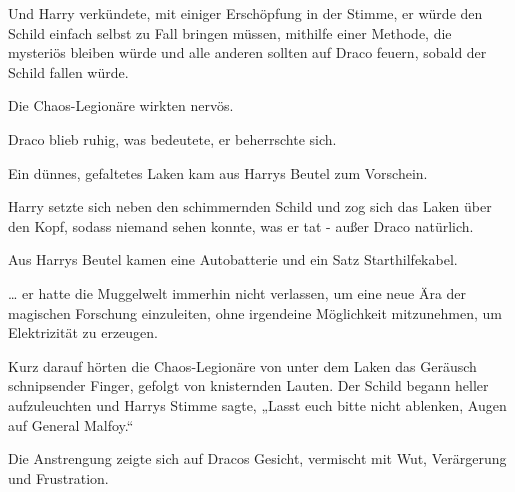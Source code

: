 Und Harry verkündete, mit einiger Erschöpfung in der Stimme, er würde den Schild einfach selbst zu Fall bringen müssen, mithilfe einer Methode, die mysteriös bleiben würde und alle anderen sollten auf Draco feuern, sobald der Schild fallen würde.

Die Chaos-Legionäre wirkten nervös.

Draco blieb ruhig, was bedeutete, er beherrschte sich.

Ein dünnes, gefaltetes Laken kam aus Harrys Beutel zum Vorschein.

Harry setzte sich neben den schimmernden Schild und zog sich das Laken über den Kopf, sodass niemand sehen konnte, was er tat - außer Draco natürlich.

Aus Harrys Beutel kamen eine Autobatterie und ein Satz Starthilfekabel.

… er hatte die Muggelwelt immerhin nicht verlassen, um eine neue Ära der magischen Forschung einzuleiten, ohne irgendeine Möglichkeit mitzunehmen, um Elektrizität zu erzeugen.

Kurz darauf hörten die Chaos-Legionäre von unter dem Laken das Geräusch schnipsender Finger, gefolgt von knisternden Lauten. Der Schild begann heller aufzuleuchten und Harrys Stimme sagte, „Lasst euch bitte nicht ablenken, Augen auf General Malfoy.“

Die Anstrengung zeigte sich auf Dracos Gesicht, vermischt mit Wut, Verärgerung und Frustration.

